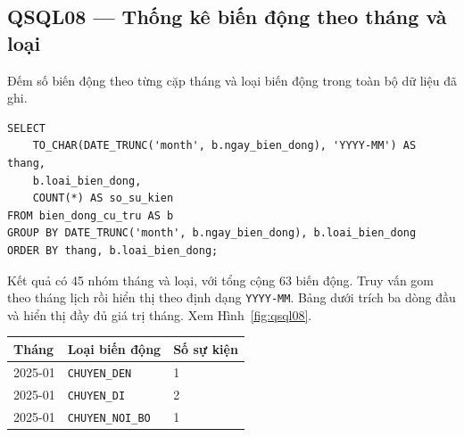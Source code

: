 \noindent\begin{minipage}{\linewidth}
\subsection*{QSQL08 --- Thống kê biến động theo tháng và loại}

Đếm số biến động theo từng cặp tháng và loại biến động trong toàn bộ dữ liệu đã ghi.

\begin{lstlisting}[style=sqlvn]
SELECT
    TO_CHAR(DATE_TRUNC('month', b.ngay_bien_dong), 'YYYY-MM') AS thang,
    b.loai_bien_dong,
    COUNT(*) AS so_su_kien
FROM bien_dong_cu_tru AS b
GROUP BY DATE_TRUNC('month', b.ngay_bien_dong), b.loai_bien_dong
ORDER BY thang, b.loai_bien_dong;
\end{lstlisting}

Kết quả có 45 nhóm tháng và loại, với tổng cộng 63 biến động. Truy vấn gom theo tháng lịch rồi hiển thị theo định dạng \texttt{YYYY-MM}. Bảng dưới trích ba dòng đầu và hiển thị đầy đủ giá trị tháng. Xem Hình~\ref{fig:qsql08}.

\begin{center}
\begin{tabular}{lll}
\hline
\textbf{Tháng} & \textbf{Loại biến động} & \textbf{Số sự kiện} \\
\hline
2025-01 & \texttt{CHUYEN\_DEN} & 1 \\
2025-01 & \texttt{CHUYEN\_DI} & 2 \\
2025-01 & \texttt{CHUYEN\_NOI\_BO} & 1 \\
\hline
\end{tabular}
\end{center}
\end{minipage}\par\medskip

